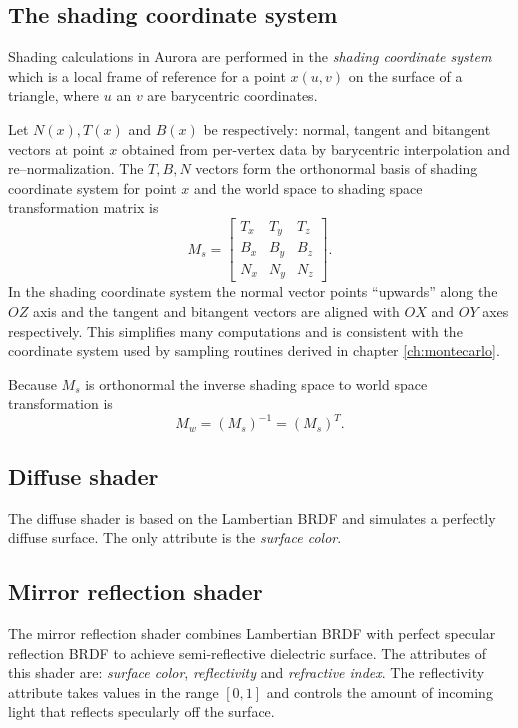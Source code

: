 \subsection{The shading coordinate system}
Shading calculations in Aurora are performed in the \emph{shading coordinate system} which is a local frame of reference for a point $x(u,v)$ on the surface of a triangle, where $u$ an $v$ are barycentric coordinates.

Let $N(x), T(x)$ and $B(x)$ be respectively: normal, tangent and bitangent vectors at point $x$ obtained from per-vertex data by barycentric interpolation and re--normalization. The $T, B, N$ vectors form the orthonormal basis of shading coordinate system for point $x$ and the world space to shading space transformation matrix is
\begin{equation}
  M_{s} = \left[
    \begin{array}{ccc}
      T_{x} & T_{y} & T_{z} \\
      B_{x} & B_{y} & B_{z} \\
      N_{x} & N_{y} & N_{z}
    \end{array}
  \right].
\end{equation}
In the shading coordinate system the normal vector points ``upwards'' along the $OZ$ axis and the tangent and bitangent vectors are aligned with $OX$ and $OY$ axes respectively. This simplifies many computations and is consistent with the coordinate system used by sampling routines derived in chapter \ref{ch:montecarlo}.

Because $M_{s}$ is orthonormal the inverse shading space to world space transformation is
\begin{equation}
  M_{w} = (M_{s})^{-1} = (M_{s})^{T}.
\end{equation}

\subsection{Diffuse shader}
The diffuse shader is based on the Lambertian BRDF and simulates a perfectly diffuse surface. The only attribute is the \emph{surface color}.

\subsection{Mirror reflection shader}
The mirror reflection shader combines Lambertian BRDF with perfect specular reflection BRDF to achieve semi-reflective dielectric surface. The attributes of this shader are: \emph{surface color}, \emph{reflectivity} and \emph{refractive index}. The reflectivity attribute takes values in the range $[0,1]$ and controls the amount of incoming light that reflects specularly off the surface.

